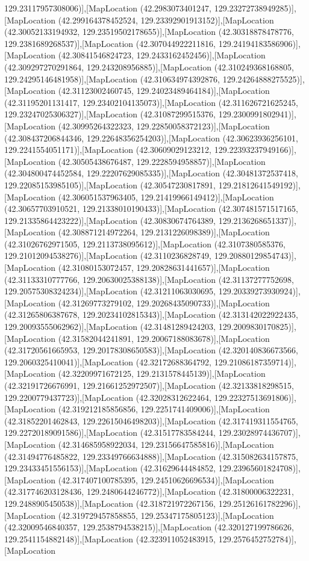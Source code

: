 129.23117957308006)],[MapLocation (42.2983073401247, 129.23272738949285)],[MapLocation (42.299164378452524, 129.23392901913152)],[MapLocation (42.30052133194932, 129.23519502178655)],[MapLocation (42.30318878478776, 129.2381689268537)],[MapLocation (42.307044922211816, 129.24194183586906)],[MapLocation (42.30841546824723, 129.2433162452456)],[MapLocation (42.309297270291864, 129.243208956885)],[MapLocation (42.310249368168805, 129.24295146481958)],[MapLocation (42.310634974392876, 129.24264888275525)],[MapLocation (42.31123002460745, 129.24023489464184)],[MapLocation (42.31195201131417, 129.23402104135073)],[MapLocation (42.311626721625245, 129.23247025306327)],[MapLocation (42.31087299515376, 129.2300991802941)],[MapLocation (42.30995264322323, 129.22850058372123)],[MapLocation (42.308437206844346, 129.22648356254203)],[MapLocation (42.30623936256101, 129.2241554051171)],[MapLocation (42.30609029123212, 129.22393237949166)],[MapLocation (42.30505438676487, 129.2228594958857)],[MapLocation (42.304800474452584, 129.22207629085335)],[MapLocation (42.30481372537418, 129.22085153985105)],[MapLocation (42.30547230817891, 129.21812641549192)],[MapLocation (42.306051537963405, 129.21419966149412)],[MapLocation (42.30657703910521, 129.21338010190433)],[MapLocation (42.307481571517165, 129.21335864423222)],[MapLocation (42.30830674764389, 129.2136268651337)],[MapLocation (42.308871214972264, 129.2131226098389)],[MapLocation (42.31026762971505, 129.2113738095612)],[MapLocation (42.3107380585376, 129.21012094538276)],[MapLocation (42.3110236828749, 129.20880129854743)],[MapLocation (42.31080153072457, 129.20828631441657)],[MapLocation (42.31133310777766, 129.20630025388138)],[MapLocation (42.31137277752698, 129.20575308324234)],[MapLocation (42.31211063030695, 129.20339273930924)],[MapLocation (42.31269773279102, 129.20268435090733)],[MapLocation (42.31265806387678, 129.20234102815343)],[MapLocation (42.313142022922435, 129.20093555062962)],[MapLocation (42.31481289424203, 129.2009830170825)],[MapLocation (42.31582044241891, 129.20067188083678)],[MapLocation (42.31720561665953, 129.20178308650583)],[MapLocation (42.320140836673566, 129.2060325410041)],[MapLocation (42.32172688364792, 129.21086187359714)],[MapLocation (42.32209971672125, 129.2131578445139)],[MapLocation (42.32191726676991, 129.21661252972507)],[MapLocation (42.32133818298515, 129.2200779437723)],[MapLocation (42.32028312622464, 129.22327513691806)],[MapLocation (42.319212185856856, 129.2251741409006)],[MapLocation (42.31852201462843, 129.22615046498203)],[MapLocation (42.317419311554765, 129.22720189091586)],[MapLocation (42.31517783584244, 129.23028974436707)],[MapLocation (42.314685958922034, 129.23156647585816)],[MapLocation (42.31494776485822, 129.23349766634888)],[MapLocation (42.315082634157875, 129.23433451556153)],[MapLocation (42.31629644484852, 129.23965601824708)],[MapLocation (42.317407100785395, 129.24510626696534)],[MapLocation (42.317746203128436, 129.2480644246772)],[MapLocation (42.31800006322231, 129.2488905450538)],[MapLocation (42.318721972267156, 129.25126161782296)],[MapLocation (42.319729457858855, 129.25347175805123)],[MapLocation (42.32009546840357, 129.2538794538215)],[MapLocation (42.320127199786626, 129.2541154882148)],[MapLocation (42.323911052483915, 129.2576452752784)],[MapLocation 